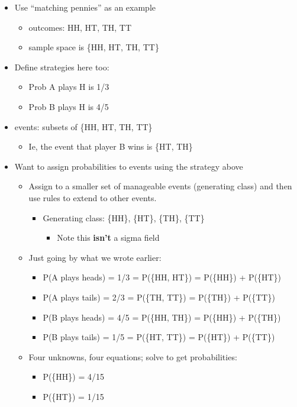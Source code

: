 \begin{itemize}
\item Use ``matching pennies'' as an example
\begin{itemize}
\item outcomes: HH, HT, TH, TT
\item sample space is \{HH, HT, TH, TT\}
\end{itemize}
\item Define strategies here too:
\begin{itemize}
\item Prob A plays H is 1/3
\item Prob B plays H is 4/5
\end{itemize}
\item events: subsets of \{HH, HT, TH, TT\}
\begin{itemize}
\item Ie, the event that player B wins is \{HT, TH\}
\end{itemize}
\item Want to assign probabilities to events using the strategy above
\begin{itemize}
\item Assign to a smaller set of manageable events (generating
          class) and then use rules to extend to other events.
\begin{itemize}
\item Generating class: \{{HH\}, \{HT\}, \{TH\}, \{TT\}}
\begin{itemize}
\item Note this \textbf{isn't} a sigma field
\end{itemize}
\end{itemize}
\item Just going by what we wrote earlier:
\begin{itemize}
\item P(A plays heads) = 1/3 = P(\{HH, HT\}) = P(\{HH\}) + P(\{HT\})
\item P(A plays tails) = 2/3 = P(\{TH, TT\}) = P(\{TH\}) + P(\{TT\})
\item P(B plays heads) = 4/5 = P(\{HH, TH\}) = P(\{HH\}) + P(\{TH\})
\item P(B plays tails) = 1/5 = P(\{HT, TT\}) = P(\{HT\}) + P(\{TT\})
\end{itemize}
\item Four unknowns, four equations; solve to get probabilities:
\begin{itemize}
\item P(\{HH\}) = 4/15
\item P(\{HT\}) = 1/15

\end{itemize}
\end{itemize}
\end{itemize}

